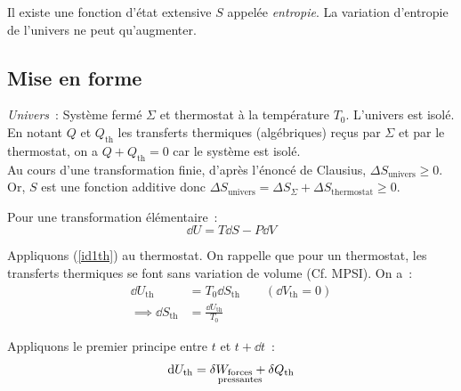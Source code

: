 \documentclass{article}
\let\oldref\ref
\renewcommand{\ref}[1]{(\oldref{#1})}
\newcommand{\fp}{{\substack{\text{forces}\\\mathclap{\text{pressantes}}}}}
\renewcommand{\th}{\mathrm{th}}
\begin{document}
\begin{enonce}
    Il existe une fonction d'état extensive $S$\footnotemark{} appelée \textit{entropie}. La variation d'entropie de l'univers ne peut qu'augmenter.
\end{enonce}

\subsection{Mise en forme}
\begin{tableau}
    \textit{Univers}~: Système fermé $\Sigma$ et thermostat à la température $T_0$. L'univers est isolé.\\
    
    En notant $Q$ et $Q_\th$ les transferts thermiques (algébriques) reçus par $\Sigma$ et par le thermostat, on a $Q+Q_\th = 0$ car le système est isolé.\\
    
    Au cours d'une transformation finie, d'après l'énoncé de Clausius, $\Delta S_{\text{univers}} \geq 0$. Or, $S$ est une fonction additive donc $\Delta S_{\text{univers}} = \Delta S_\Sigma + \Delta S_{\text{thermostat}} \geq 0$.
    
    \begin{enonce}
        Pour une transformation élémentaire~:
        \begin{equation}\label{id1th}
            \dd{U} = T\dd{S} - P\dd{V}
        \end{equation}
    \end{enonce}
    
    Appliquons \ref{id1th} au thermostat. On rappelle que pour un thermostat, les transferts thermiques se font sans variation de volume (Cf. MPSI). On a~:
    \begin{align*}
        \dd{U_\th} &= T_0\dd{S_\th}\qquad (\dd{V_\th} = 0)\\
        \implies \dd{S_\th} &= \frac{\dd{U_\th}}{T_0}
    \end{align*}
    
    Appliquons le premier principe entre $t$ et $t+\dd{t}$~:
    $$\dd{U_\th} = \delta W_{\fp} + \delta Q_\th$$
    

\end{tableau}
\end{document}
